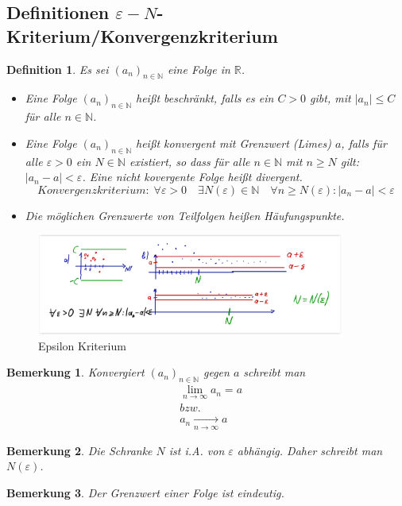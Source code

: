 \documentclass[12pt,a4paper]{article}%
\newtheorem{definition}[satz]{Definition}
\newtheorem{bem}{Bemerkung}[section]
\numberwithin{equation}{section}
\newcommand{\R}{\mathbb{R}} %
\newcommand{\N}{\mathbb{N}}
\numberwithin{equation}{subsection}
\begin{document}
  \subsection{Definitionen $\varepsilon-N$-Kriterium/Konvergenzkriterium}
  \begin{definition}
    Es sei $(a_n)_{n \in \N}$ eine Folge in $\R$.
    \begin{itemize}
      \item[a)] Eine Folge $(a_n)_{n \in \N}$ heißt beschränkt, falls es ein $C > 0$ gibt, mit $|a_n| \leq C$ für alle $n \in \N$.
      \item[b)] Eine Folge $(a_n)_{n \in \N}$ heißt konvergent mit Grenzwert (Limes) $a$, falls für alle $\varepsilon > 0$ ein $N\in \N$ existiert, so dass für alle $n \in \N$ mit $n \geq N$ gilt: $|a_n - a| < \varepsilon$. Eine nicht kovergente Folge heißt divergent.
      \begin{equation}
        Konvergenzkriterium:\; \forall \varepsilon > 0 \quad \exists N(\varepsilon) \in \N \quad \forall n \geq N(\varepsilon): |a_n -a| < \varepsilon \label{eq:folge_konvergenz}
      \end{equation}
      \item[c)] Die möglichen Grenzwerte von Teilfolgen heißen Häufungspunkte.
    \end{itemize}\label{def:folge_konvergenz}
  \end{definition}
  \begin{figure}[htbp] 
	  \centering
	  \includegraphics[width=0.9\textwidth]{folge_epsil_krit.png}
	  \caption{Epsilon Kriterium\protect\cite{HM12}}
	  \label{fig:folge_epsilon}
	\end{figure}
  \begin{bem}
    Konvergiert $(a_n)_{n \in \N}$ gegen $a$ schreibt man
    \begin{align}
      &\lim_{n \rightarrow \infty} a_n = a\\
      &bzw. \nonumber \\
      &a_n \underset{n \rightarrow \infty}{\rightarrow} a \nonumber
    \end{align}
  \end{bem}
  \begin{bem}
    Die Schranke $N$ ist i.A. von $\varepsilon$ abhängig. Daher schreibt man $N(\varepsilon)$.
  \end{bem}
  \begin{bem}
    Der Grenzwert einer Folge ist eindeutig.
  \end{bem}
  
\end{document}
